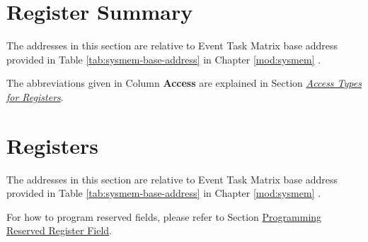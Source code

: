 \documentclass[main\_\_EN.tex]{subfiles}
\begin{document}

\newpage
\hypertarget{evntaskmatrix-reg-summ}{}
\section{Register Summary}
\label{sec:evntaskmatrix-reg-summ}

The addresses in this section are relative to Event Task Matrix base address provided in Table \ref{tab:sysmem-base-address} in Chapter \ref{mod:sysmem} \textit{}.

The abbreviations given in Column \textbf{Access} are explained in Section \hyperref[glossary-access-types]{\textit{Access Types for Registers}}.






\newpage
\section{Registers}

The addresses in this section are relative to Event Task Matrix base address provided in Table \ref{tab:sysmem-base-address} in Chapter \ref{mod:sysmem} \textit{}.

For how to program reserved fields, please refer to Section \hyperref[programming-reserved-field]{Programming Reserved Register Field}.

\end{document}
